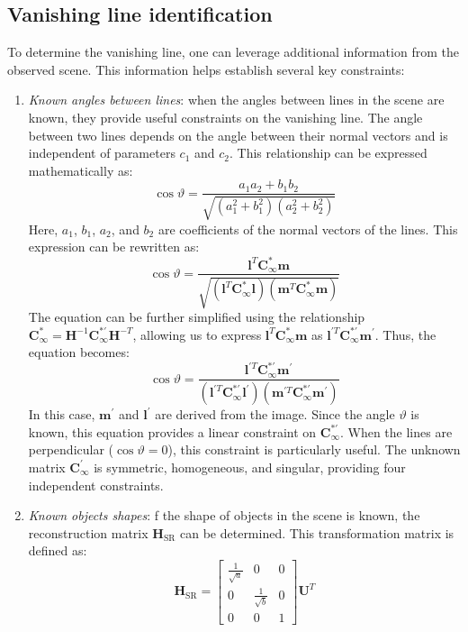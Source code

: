 \subsection{Vanishing line identification}
To determine the vanishing line, one can leverage additional information from the observed scene. 
This information helps establish several key constraints:
\begin{enumerate}
    \item \textit{Known angles between lines}: when the angles between lines in the scene are known, they provide useful constraints on the vanishing line. 
        The angle between two lines depends on the angle between their normal vectors and is independent of parameters $c_1$ and $c_2$. 
        This relationship can be expressed mathematically as:
        \[\cos\vartheta=\dfrac{a_1a_2+b_1b_2}{\sqrt{(a_1^2+b_1^2)(a_2^2+b_2^2)}}\]
        Here, $a_1$, $b_1$, $a_2$, and $b_2$ are coefficients of the normal vectors of the lines. 
        This expression can be rewritten as:
        \[\cos\vartheta=\dfrac{\mathbf{l}^T\mathbf{C}_{\infty}^\ast \mathbf{m}}{\sqrt{(\mathbf{l}^T\mathbf{C}_{\infty}^\ast \mathbf{l})(\mathbf{m}^T\mathbf{C}_{\infty}^\ast \mathbf{m})}}\]
        The equation can be further simplified using the relationship $\mathbf{C}_{\infty}^\ast=\mathbf{H}^{-1}\mathbf{C}_{\infty}^{\ast\prime}\mathbf{H}^{-T}$, allowing us to express $\mathbf{l}^T\mathbf{C}_{\infty}^\ast \mathbf{m}$ as $\mathbf{l}^{\prime T}\mathbf{C}_{\infty}^{\ast\prime}\mathbf{m}^\prime$. 
        Thus, the equation becomes:
        \[\cos\vartheta=\dfrac{\mathbf{l}^{\prime T}\mathbf{C}_{\infty}^{\ast\prime}\mathbf{m}^\prime}{(\mathbf{l}^{\prime T}\mathbf{C}_{\infty}^{\ast\prime}\mathbf{l}^\prime)(\mathbf{m}^{\prime T}\mathbf{C}_{\infty}^{\ast\prime}\mathbf{m}^\prime)}\]
        In this case, $\mathbf{m}^\prime$ and $\mathbf{l}^\prime$ are derived from the image. 
        Since the angle $\vartheta$ is known, this equation provides a linear constraint on $\mathbf{C}_{\infty}^{\ast\prime}$. 
        When the lines are perpendicular ($\cos\vartheta=0$), this constraint is particularly useful.
        The unknown matrix $\mathbf{C}_{\infty}^\prime$ is symmetric, homogeneous, and singular, providing four independent constraints.
    \item \textit{Known objects shapes}: f the shape of objects in the scene is known, the reconstruction matrix $\mathbf{H}_\text{SR}$ can be determined. 
        This transformation matrix is defined as:
        \[\mathbf{H}_\text{SR} = \begin{bmatrix} \frac{1}{\sqrt{a}} & 0 & 0 \\ 0 & \frac{1}{\sqrt{b}} & 0 \\ 0 & 0 & 1 \end{bmatrix}\mathbf{U}^T\]

\end{enumerate}
